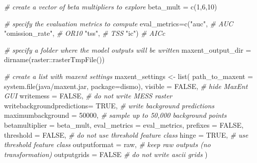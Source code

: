 \documentclass[
]{article}
\newenvironment{Shaded}{\begin{snugshade}}{\end{snugshade}}
\newcommand{\AttributeTok}[1]{\textcolor[rgb]{0.77,0.63,0.00}{#1}}
\newcommand{\CommentTok}[1]{\textcolor[rgb]{0.56,0.35,0.01}{\textit{#1}}}
\newcommand{\ConstantTok}[1]{\textcolor[rgb]{0.00,0.00,0.00}{#1}}
\newcommand{\DecValTok}[1]{\textcolor[rgb]{0.00,0.00,0.81}{#1}}
\newcommand{\FunctionTok}[1]{\textcolor[rgb]{0.00,0.00,0.00}{#1}}
\newcommand{\NormalTok}[1]{#1}
\newcommand{\OtherTok}[1]{\textcolor[rgb]{0.56,0.35,0.01}{#1}}
\newcommand{\SpecialCharTok}[1]{\textcolor[rgb]{0.00,0.00,0.00}{#1}}
\newcommand{\StringTok}[1]{\textcolor[rgb]{0.31,0.60,0.02}{#1}}
\begin{document}
\begin{Shaded}
\begin{Highlighting}[]
\CommentTok{\# create a vector of beta multipliers to explore}
\NormalTok{beta\_mult }\OtherTok{=} \FunctionTok{c}\NormalTok{(}\DecValTok{1}\NormalTok{,}\DecValTok{6}\NormalTok{,}\DecValTok{10}\NormalTok{)}

\CommentTok{\# specify the evaluation metrics to compute}
\NormalTok{eval\_metrics}\OtherTok{=}\FunctionTok{c}\NormalTok{(}\StringTok{"auc"}\NormalTok{,           }\CommentTok{\# AUC}
               \StringTok{"omission\_rate"}\NormalTok{, }\CommentTok{\# OR10}
               \StringTok{"tss"}\NormalTok{,           }\CommentTok{\# TSS}
               \StringTok{"ic"}\NormalTok{)            }\CommentTok{\# AICc}

\CommentTok{\# specify a folder where the model outputs will be written}
\NormalTok{maxent\_output\_dir }\OtherTok{=} \FunctionTok{dirname}\NormalTok{(raster}\SpecialCharTok{::}\FunctionTok{rasterTmpFile}\NormalTok{())}
  
\CommentTok{\# create a list with maxent settings}
\NormalTok{maxent\_settings }\OtherTok{\textless{}{-}} \FunctionTok{list}\NormalTok{(}
  \AttributeTok{path\_to\_maxent            =} \FunctionTok{system.file}\NormalTok{(}\StringTok{\textquotesingle{}java/maxent.jar\textquotesingle{}}\NormalTok{, }\AttributeTok{package=}\StringTok{\textquotesingle{}dismo\textquotesingle{}}\NormalTok{),}
  \AttributeTok{visible                   =} \ConstantTok{FALSE}\NormalTok{,  }\CommentTok{\# hide MaxEnt GUI}
  \AttributeTok{writemess                 =} \ConstantTok{FALSE}\NormalTok{,  }\CommentTok{\# do not write MESS raster}
  \AttributeTok{writebackgroundpredictions=} \ConstantTok{TRUE}\NormalTok{,   }\CommentTok{\# write background predictions}
  \AttributeTok{maximumbackground         =} \DecValTok{50000}\NormalTok{,  }\CommentTok{\# sample up to 50,000 background points}
  \AttributeTok{betamultiplier            =}\NormalTok{ beta\_mult,}
  \AttributeTok{eval\_metrics              =}\NormalTok{ eval\_metrics,}
  \AttributeTok{prefixes                  =} \ConstantTok{FALSE}\NormalTok{,}
  \AttributeTok{threshold                 =} \ConstantTok{FALSE}\NormalTok{,  }\CommentTok{\# do not use threshold feature class}
  \AttributeTok{hinge                     =} \ConstantTok{TRUE}\NormalTok{,   }\CommentTok{\# use threshold feature class}
  \AttributeTok{outputformat              =} \StringTok{\textquotesingle{}raw\textquotesingle{}}\NormalTok{,  }\CommentTok{\# keep raw outputs (no transformation)}
  \AttributeTok{outputgrids               =} \ConstantTok{FALSE}   \CommentTok{\# do not write ascii grids}
\NormalTok{)}


\end{Highlighting}
\end{Shaded}
\end{document}
